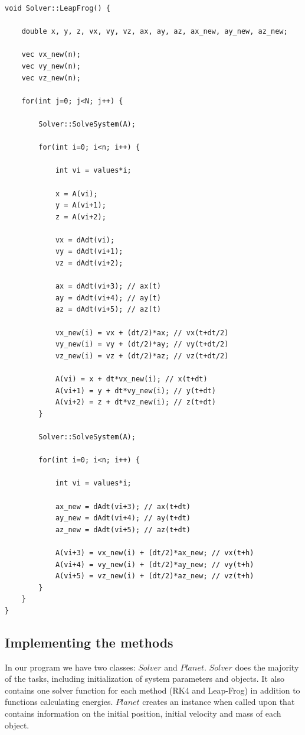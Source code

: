 \documentclass[a4paper,12pt, english]{article}
\begin{document}
 \begin{lstlisting}[title={Function Leap Frog}]
void Solver::LeapFrog() {

    double x, y, z, vx, vy, vz, ax, ay, az, ax_new, ay_new, az_new;

    vec vx_new(n);
    vec vy_new(n);
    vec vz_new(n);

    for(int j=0; j<N; j++) {

        Solver::SolveSystem(A);

        for(int i=0; i<n; i++) {

            int vi = values*i;

            x = A(vi);
            y = A(vi+1);
            z = A(vi+2);

            vx = dAdt(vi);
            vy = dAdt(vi+1);
            vz = dAdt(vi+2);

            ax = dAdt(vi+3); // ax(t)
            ay = dAdt(vi+4); // ay(t)
            az = dAdt(vi+5); // az(t)

            vx_new(i) = vx + (dt/2)*ax; // vx(t+dt/2)
            vy_new(i) = vy + (dt/2)*ay; // vy(t+dt/2)
            vz_new(i) = vz + (dt/2)*az; // vz(t+dt/2)

            A(vi) = x + dt*vx_new(i); // x(t+dt)
            A(vi+1) = y + dt*vy_new(i); // y(t+dt)
            A(vi+2) = z + dt*vz_new(i); // z(t+dt)
        }

        Solver::SolveSystem(A);

        for(int i=0; i<n; i++) {

            int vi = values*i;

            ax_new = dAdt(vi+3); // ax(t+dt)
            ay_new = dAdt(vi+4); // ay(t+dt)
            az_new = dAdt(vi+5); // az(t+dt)

            A(vi+3) = vx_new(i) + (dt/2)*ax_new; // vx(t+h)
            A(vi+4) = vy_new(i) + (dt/2)*ay_new; // vy(t+h)
            A(vi+5) = vz_new(i) + (dt/2)*az_new; // vz(t+h)
        }
    }
}
\end{lstlisting}

\subsection*{Implementing the methods}
In our program we have two classes: $Solver$ and $Planet$. $Solver$ does the majority of the tasks, including initialization of system parameters and objects. It also contains one  solver function for each method (RK4 and Leap-Frog) in addition to functions calculating energies. $Planet$ creates an instance when called upon that contains information on the initial position, initial velocity and mass of each object.
\end{document}
